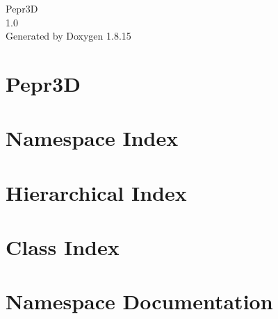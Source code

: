 \let\mypdfximage\pdfximage\def\pdfximage{\immediate\mypdfximage}\documentclass[twoside]{book}
\newcommand{\+}{\discretionary{\mbox{\scriptsize$\hookleftarrow$}}{}{}}
\newcommand{\clearemptydoublepage}{%
  \newpage{\pagestyle{empty}\cleardoublepage}%
}
\begin{document}
\hypersetup{pageanchor=false,
             bookmarksnumbered=true,
             pdfencoding=unicode
            }
\begin{titlepage}
\vspace*{7cm}
\begin{center}%
{\Large Pepr3D \\[1ex]\large 1.\+0 }\\
\vspace*{1cm}
{\large Generated by Doxygen 1.8.15}\\
\end{center}
\end{titlepage}
\clearemptydoublepage
{}
\tableofcontents
\clearemptydoublepage
{}
\hypersetup{pageanchor=true}

\chapter{Pepr3D}
\label{index}\hypertarget{index}{}
\chapter{Namespace Index}

\chapter{Hierarchical Index}

\chapter{Class Index}

\chapter{Namespace Documentation}



\end{document}
